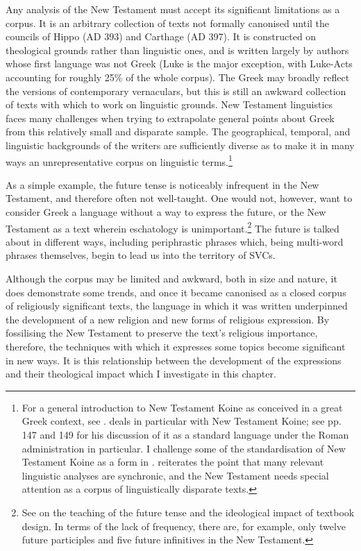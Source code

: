 \documentclass[output=paper,colorlinks,citecolor=brown]{langscibook}
\begin{document}
Any analysis of the New Testament must accept its significant
limitations as a corpus. 
It is an arbitrary collection of texts not
formally canonised until the councils of Hippo (AD 393) and Carthage (AD
397). 
It is constructed on theological grounds rather than linguistic
ones, and is written largely by authors whose first language was not
Greek (Luke is the major exception, with Luke-Acts accounting for
roughly 25\% of the whole corpus). 
The Greek may broadly reflect the
versions of contemporary vernaculars, but this is still an awkward
collection of texts with which to work on linguistic grounds. New
Testament linguistics faces many challenges when trying to extrapolate
general points about Greek from this relatively small and disparate
sample. 
The geographical, temporal, and linguistic backgrounds of the
writers are sufficiently diverse as to make it in many ways an
unrepresentative corpus on linguistic terms.\footnote{For a general
  introduction to New Testament Koine as conceived in a great Greek
  context, see \citet{georgakopoulou_standard_2009}. \citet[147–152]{horrocks_greek_2010} deals in particular with New Testament Koine; see pp. 147 and 149 for his
  discussion of it as a standard language under the Roman
  administration in particular. I challenge some of the standardisation of New Testament Koine as a form in \citet{ryan_teaching_2024}.
  \citet[243]{tronci_aorist_2018} reiterates
  the point that many relevant linguistic analyses are synchronic, and
  the New Testament needs special attention as a corpus of
  linguistically disparate texts.}~~

As a simple example, the future tense is noticeably infrequent in the
New Testament, and therefore often not well-taught. 
One would not,
however, want to consider Greek a language without a way to express the
future, or the New Testament as a text wherein eschatology is
unimportant.\footnote{See \citet{ryan_teaching_2024} on the teaching of the future
  tense and the ideological impact of textbook design. 
In terms of the
  lack of frequency, there are, for example, only twelve future
  participles and five future infinitives in the New Testament.} 
The
future is talked about in different ways, including periphrastic phrases
which, being multi-word phrases themselves, begin to lead us into the
territory of SVCs.~

Although the corpus may be limited and awkward, both in size and nature, it does demonstrate some trends, and once it became canonised
as a closed corpus of religiously significant texts, the language in
which it was written underpinned the development of a new religion and
new forms of religious expression. 
By fossilising the New Testament to
preserve the text's religious importance, therefore, the techniques with
which it expresses some topics become significant in new ways. 
It is
this relationship between the development of the expressions and their
theological impact which I investigate in this chapter.~
\end{document}
